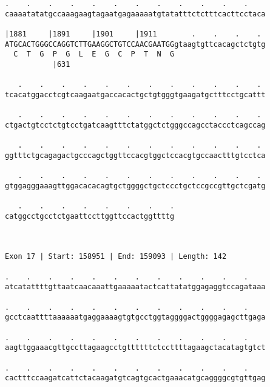 \documentclass{article}
\begin{document}
\begin{Verbatim}
.    .    .    .    .    .    .    .    .    .    .    .    
caaaatatatgccaaagaagtagaatgagaaaaatgtatatttctctttcacttcctaca
                                                            
|1881     |1891     |1901     |1911        .    .    .    . 
ATGCACTGGGCCAGGTCTTGAAGGCTGTCCAACGAATGGgtaagtgttcacagctctgtg
  C  T  G  P  G  L  E  G  C  P  T  N  G                     
           |631                                             
  
   .    .    .    .    .    .    .    .    .    .    .    . 
tcacatggacctcgtcaagaatgaccacactgctgtgggtgaagatgctttcctgcattt
                                                            
   .    .    .    .    .    .    .    .    .    .    .    . 
ctgactgtcctctgtcctgatcaagtttctatggctctgggccagcctaccctcagccag
                                                            
   .    .    .    .    .    .    .    .    .    .    .    . 
ggtttctgcagagactgcccagctggttccacgtggctccacgtgccaactttgtcctca
                                                            
   .    .    .    .    .    .    .    .    .    .    .    . 
gtggagggaaagttggacacacagtgctggggctgctccctgctccgccgttgctcgatg
                                                            
   .    .    .    .    .    .    .    .
catggcctgcctctgaattccttggttccactggttttg
                                       
                                       
 
Exon 17 | Start: 158951 | End: 159093 | Length: 142
 
.    .    .    .    .    .    .    .    .    .    .    .    
atcatattttgttaatcaacaaattgaaaaatactcattatatggagaggtccagataaa
                                                            
.    .    .    .    .    .    .    .    .    .    .    .    
gcctcaattttaaaaaatgaggaaaagtgtgcctggtaggggactggggagagcttgaga
                                                            
.    .    .    .    .    .    .    .    .    .    .    .    
aagttggaaacgttgccttagaagcctgttttttctccttttagaagctacatagtgtct
                                                            
.    .    .    .    .    .    .    .    .    .    .    .    
cactttccaagatcattctacaagatgtcagtgcactgaaacatgcaggggcgtgttgag
                                                            

\end{Verbatim}
\end{document}
